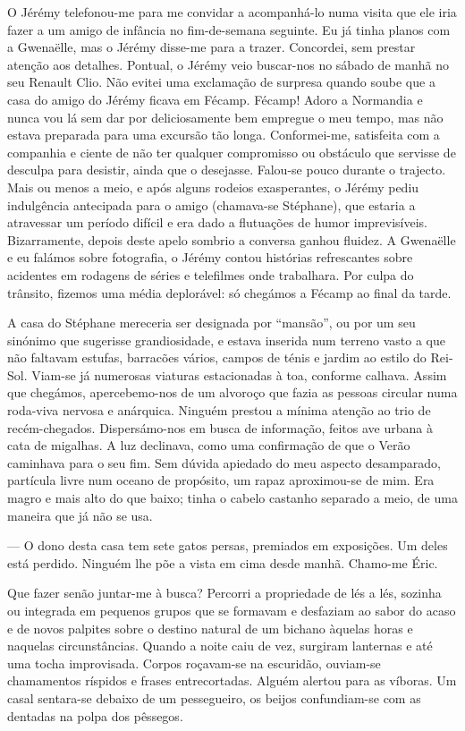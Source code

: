 O Jérémy telefonou-me para me convidar a acompanhá-lo numa visita que
ele iria fazer a um amigo de infância no fim-de-semana seguinte. Eu já tinha planos com a Gwenaëlle, mas o Jérémy
disse-me para a trazer. Concordei, sem prestar atenção aos detalhes.
Pontual, o Jérémy veio buscar-nos no sábado de manhã no seu Renault
Clio. Não evitei uma exclamação de surpresa quando soube que a casa do
amigo do Jérémy ficava em Fécamp. Fécamp! Adoro a Normandia e nunca vou
lá sem dar por deliciosamente bem empregue o meu tempo, mas não estava
preparada para uma excursão tão longa. Conformei-me, satisfeita com a
companhia e ciente de não ter qualquer compromisso ou obstáculo que
servisse de desculpa para desistir, ainda que o desejasse. Falou-se pouco durante o trajecto. Mais ou menos a meio, e após alguns rodeios
exasperantes, o Jérémy pediu indulgência antecipada para o amigo
(chamava-se Stéphane), que estaria a atravessar um período difícil e era
dado a flutuações de humor imprevisíveis. Bizarramente, depois deste
apelo sombrio a conversa ganhou fluidez. A Gwenaëlle e eu falámos sobre
fotografia, o Jérémy contou histórias refrescantes sobre acidentes em
rodagens de séries e telefilmes onde trabalhara. Por culpa
do trânsito, fizemos uma média deplorável: só chegámos a Fécamp ao final
da tarde.

A casa do Stéphane mereceria ser designada por ``mansão'', ou por um
seu sinónimo que sugerisse grandiosidade, e estava inserida num terreno
vasto a que não faltavam estufas, barracões vários, campos de ténis e
jardim ao estilo do Rei-Sol. Viam-se já numerosas viaturas estacionadas à toa, conforme
calhava. Assim que chegámos, apercebemo-nos de um alvoroço que fazia as
pessoas circular numa roda-viva nervosa e anárquica. Ninguém prestou a
mínima atenção ao trio de recém-chegados. Dispersámo-nos em busca de
informação, feitos ave urbana à cata de migalhas. A luz declinava,
como uma confirmação de que o Verão caminhava para o seu fim. Sem dúvida
apiedado do meu aspecto desamparado, partícula livre num oceano de
propósito, um rapaz aproximou-se de mim. Era magro e mais alto do que
baixo; tinha o cabelo castanho separado a meio, de uma maneira que já
não se usa.

--- O dono desta casa tem sete gatos persas, premiados em exposições. Um
deles está perdido. Ninguém lhe põe a vista em cima desde manhã.
Chamo-me Éric.

Que fazer senão juntar-me à busca? Percorri a propriedade de lés a
lés, sozinha ou integrada em pequenos grupos que se formavam e desfaziam
ao sabor do acaso e de novos palpites sobre o destino natural de um
bichano àquelas horas e naquelas circunstâncias. Quando a noite caiu de
vez, surgiram lanternas e até uma tocha improvisada. Corpos roçavam-se
na escuridão, ouviam-se chamamentos ríspidos e frases entrecortadas.
Alguém alertou para as víboras. Um casal sentara-se debaixo de um
pessegueiro, os beijos confundiam-se com as dentadas na polpa dos
pêssegos.

